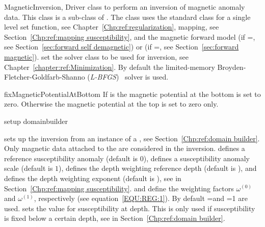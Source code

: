 \begin{classdesc}{MagneticInversion}{, 
}
Driver class to perform an inversion of magnetic anomaly data. This class
is a sub-class of . The class uses the standard
 class for a single level set function, see Chapter~\ref{Chp:ref:regularization},
 mapping, see Section~\ref{Chp:ref:mapping susceptibility},
and the magnetic forward model  (if =\True,
see Section~\ref{sec:forward self demagnetic}) or   
(if =\False, see Section~\ref{sec:forward magnetic}).
 set the solver class to be used for inversion,
see Chapter~\ref{chapter:ref:Minimization}.
 By default the limited-memory Broyden-Fletcher-Goldfarb-Shanno (\emph{L-BFGS})~\cite{Nocedal1980} solver is used.

\end{classdesc}

\begin{methoddesc}[MagneticInversion]{fixMagneticPotentialAtBottom}{}
If  is \True the magnetic potential at the bottom is set to zero. Otherwise  the magnetic
 potential at the top is set to zero only. 
\end{methoddesc}



\begin{methoddesc}[MagneticInversion]{setup}{
domainbuilder
}

sets up the inversion from an instance  of a , see Section~\ref{Chp:ref:domain builder}.
Only magnetic data attached to the  are considered in the inversion.
 defines a reference susceptibility anomaly (default is $0$), 
 defines a susceptibility anomaly scale (default is $1$),
 defines the depth weighting reference depth (default is \None), and
 defines the depth weighting exponent (default is \None),
see  in Section~\ref{Chp:ref:mapping susceptibility}.
 and  define the weighting factors
$\omega^{(0)}$ and
$\omega^{(1)}$, respectively (see equation~\ref{EQU:REG:1}).
By default =\None and =1 are used.
 sets the value for susceptibility at depth. This is only used if susceptibility is fixed below a certain depth,
see  in Section~\ref{Chp:ref:domain builder}.
\end{methoddesc}

